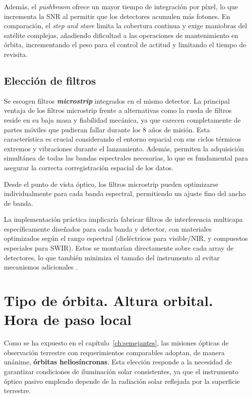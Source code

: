 Además, el \textit{pushbroom} ofrece un mayor tiempo de integración por píxel, lo que incrementa la SNR al permitir que los detectores acumulen más fotones. En comparación, el \textit{step and stare} limita la cobertura continua y exige maniobras del satélite complejas, añadiendo dificultad a las operaciones de mantenimiento en órbita, incrementando el peso para el control de actitud y limitando el tiempo de revisita.

\subsection{Elección de filtros}

Se escogen filtros \textit{\textbf{microstrip}} integrados en el mismo detector. La principal ventaja de los filtros microstrip frente a alternativas como la rueda de filtros reside en su baja masa y fiabilidad mecánica, ya que carecen completamente de partes móviles que pudieran fallar durante los 8 años de misión. Esta característica es crucial considerando el entorno espacial con sus ciclos térmicos extremos y vibraciones durante el lanzamiento. Además, permiten la adquisición simultánea de todas las bandas espectrales necesarias, lo que es fundamental para asegurar la correcta corregistración espacial de los datos.


Desde el punto de vista óptico, los filtros microstrip pueden optimizarse individualmente para cada banda espectral, permitiendo un ajuste fino del ancho de banda.


La implementación práctica implicaría fabricar filtros de interferencia multicapa específicamente diseñados para cada banda y detector, con materiales optimizados según el rango espectral (dieléctricos para visible/NIR, y compuestos especiales para SWIR). Estos se montarían directamente sobre cada array de detectores, lo que también minimiza el tamaño del instrumento al evitar mecanismos adicionales \cite{macleod2010}.

\section{Tipo de órbita. Altura orbital. Hora de paso local}

Como se ha expuesto en el capítulo~\ref{ch:semejantes}, las misiones ópticas de observación terrestre con requerimientos comparables adoptan, de manera unánime, \textbf{órbitas heliosíncronas}. Esta elección responde a la necesidad de garantizar condiciones de iluminación solar consistentes, ya que el instrumento óptico pasivo empleado depende de la radiación solar reflejada por la superficie terrestre.


